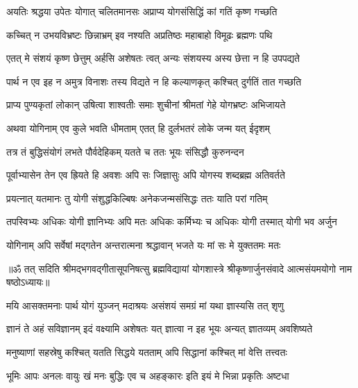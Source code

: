 \twolineshloka
{अयतिः श्रद्धया उपेतः योगात् चलितमानसः}
{अप्राप्य योगसंसिद्धिं कां गतिं कृष्ण गच्छति}%

\twolineshloka
{कच्चित् न उभयविभ्रष्टः छिन्नाभ्रम् इव नश्यति}
{अप्रतिष्ठः महाबाहो विमूढः ब्रह्मणः पथि}%

\twolineshloka
{एतत् मे संशयं कृष्ण छेत्तुम् अर्हसि अशेषतः}
{त्वत् अन्यः संशयस्य अस्य छेत्ता न हि उपपद्यते}%


\twolineshloka
{पार्थ न एव इह न अमुत्र विनाशः तस्य विद्यते}
{न हि कल्याणकृत् कश्चित् दुर्गतिं तात गच्छति}%

\twolineshloka
{प्राप्य पुण्यकृतां लोकान् उषित्वा शाश्वतीः समाः}
{शुचीनां श्रीमतां गेहे योगभ्रष्टः अभिजायते}%

\twolineshloka
{अथवा योगिनाम् एव कुले भवति धीमताम्}
{एतत् हि दुर्लभतरं लोके जन्म यत् ईदृशम्}%

\twolineshloka
{तत्र तं बुद्धिसंयोगं लभते पौर्वदेहिकम्}
{यतते च ततः भूयः संसिद्धौ कुरुनन्दन}%

\twolineshloka
{पूर्वाभ्यासेन तेन एव ह्रियते हि अवशः अपि सः}
{जिज्ञासुः अपि योगस्य शब्दब्रह्म अतिवर्तते}%

\twolineshloka
{प्रयत्नात् यतमानः तु योगी संशुद्धकिल्बिषः}
{अनेकजन्मसंसिद्धः ततः याति परां गतिम्}%

\twolineshloka
{तपस्विभ्यः अधिकः योगी ज्ञानिभ्यः अपि मतः अधिकः}
{कर्मिभ्यः च अधिकः योगी तस्मात् योगी भव अर्जुन}%

\twolineshloka
{योगिनाम् अपि सर्वेषां मद्गतेन अन्तरात्मना}
{श्रद्धावान् भजते यः मां सः मे युक्ततमः मतः}%

{॥ॐ तत् सदिति श्रीमद्भगवद्गीतासूपनिषत्सु ब्रह्मविद्यायां योगशास्त्रे श्रीकृष्णार्जुनसंवादे आत्मसंयमयोगो नाम षष्ठोऽध्यायः॥}



\twolineshloka
{मयि आसक्तमनाः पार्थ योगं युञ्जन् मदाश्रयः}
{असंशयं समग्रं मां यथा ज्ञास्यसि तत् शृणु}%

\twolineshloka
{ज्ञानं ते अहं सविज्ञानम् इदं वक्ष्यामि अशेषतः}
{यत् ज्ञात्वा न इह भूयः अन्यत् ज्ञातव्यम् अवशिष्यते}%

\twolineshloka
{मनुष्याणां सहस्रेषु कश्चित् यतति सिद्धये}
{यतताम् अपि सिद्धानां कश्चित् मां वेत्ति तत्त्वतः}%

\twolineshloka
{भूमिः आपः अनलः वायुः खं मनः बुद्धिः एव च}
{अहङ्कारः इति इयं मे भिन्ना प्रकृतिः अष्टधा}%

